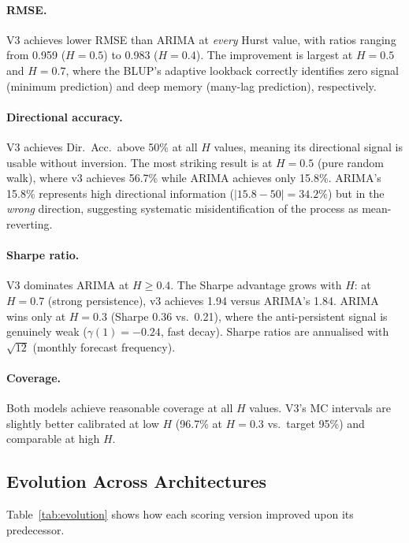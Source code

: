 \documentclass[12pt,a4paper]{article}
\begin{document}
\paragraph{RMSE.}
V3 achieves lower RMSE than ARIMA at \emph{every} Hurst value, with ratios
ranging from 0.959 ($H = 0.5$) to 0.983 ($H = 0.4$).  The improvement is
largest at $H = 0.5$ and $H = 0.7$, where the BLUP's adaptive lookback
correctly identifies zero signal (minimum prediction) and deep memory
(many-lag prediction), respectively.

\paragraph{Directional accuracy.}
V3 achieves Dir.\ Acc.\ above 50\% at all $H$ values, meaning its
directional signal is usable without inversion.  The most striking result
is at $H = 0.5$ (pure random walk), where v3 achieves 56.7\% while ARIMA
achieves only 15.8\%.  ARIMA's 15.8\% represents high directional
information ($|15.8 - 50| = 34.2\%$) but in the \emph{wrong} direction,
suggesting systematic misidentification of the process as mean-reverting.

\paragraph{Sharpe ratio.}
V3 dominates ARIMA at $H \geq 0.4$.  The Sharpe advantage grows with $H$:
at $H = 0.7$ (strong persistence), v3 achieves 1.94 versus ARIMA's 1.84.
ARIMA wins only at $H = 0.3$ (Sharpe 0.36 vs.\ 0.21), where the
anti-persistent signal is genuinely weak ($\gamma(1) = -0.24$, fast decay).
Sharpe ratios are annualised with $\sqrt{12}$ (monthly forecast frequency).

\paragraph{Coverage.}
Both models achieve reasonable coverage at all $H$ values.  V3's MC
intervals are slightly better calibrated at low $H$ (96.7\% at $H = 0.3$
vs.\ target 95\%) and comparable at high $H$.

\subsection{Evolution Across Architectures}

Table~\ref{tab:evolution} shows how each scoring version improved upon
its predecessor.
\end{document}
